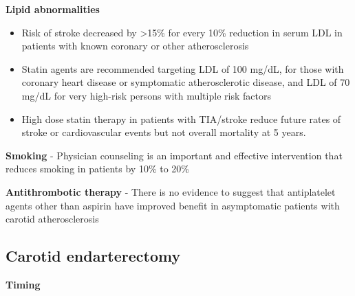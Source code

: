 \documentclass[
]{book}
\begin{document}
\textbf{Lipid abnormalities}

\begin{itemize}
\item
  Risk of stroke decreased by \textgreater15\% for every 10\% reduction in serum
  LDL in patients with known coronary or other atherosclerosis
\item
  Statin agents are recommended targeting LDL of 100 mg/dL, for those
  with coronary heart disease or symptomatic atherosclerotic disease,
  and LDL of 70 mg/dL for very high-risk persons with multiple risk
  factors
\item
  High dose statin therapy in patients with TIA/stroke reduce future
  rates of stroke or cardiovascular events but not overall mortality
  at 5 years. \citet{karamHighDoseAtorvastatinStroke2008}
\end{itemize}

\textbf{Smoking} - Physician counseling is an important and effective
intervention that reduces smoking in patients by 10\% to 20\%

\textbf{Antithrombotic therapy} - There is no evidence to suggest that
antiplatelet agents other than aspirin have improved benefit in
asymptomatic patients with carotid atherosclerosis

\hypertarget{carotid-endarterectomy}{%
\subsection{\texorpdfstring{\textbf{Carotid endarterectomy}}{Carotid endarterectomy}}\label{carotid-endarterectomy}}

\textbf{Timing}
\end{document}
